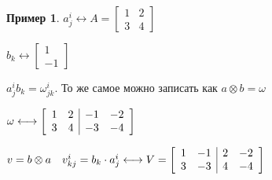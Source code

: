 \documentclass{book}
\theoremstyle{definition}
\newtheorem*{example}{Пример}
\begin{document}
         \begin{example}
             $a^i_j \longleftrightarrow A = \begin{bmatrix} 1 & 2\\ 3 & 4 \end{bmatrix} $

             $b_k \longleftrightarrow \begin{bmatrix} 1\\-1 \end{bmatrix} $

             $a^i_jb_k = \omega^i_{jk}$. То же самое можно записать как  $a\otimes b = \omega$

             $\omega \longleftrightarrow \left[
                 \begin{array}{c c | c c}
                     1 & 2 & -1 & -2\\ 3 & 4 & -3 & -4
                \end{array}
             \right]$

             $v = b\otimes a\quad v^i_{kj} = b_k\cdot a^i_j\longleftrightarrow V = \left[
                 \begin{array}{c c | c c}
                    1 & -1 & 2 & -2\\ 3 & -3 & 4 & -4
                \end{array}
             \right]$
        \end{example}
\end{document}
